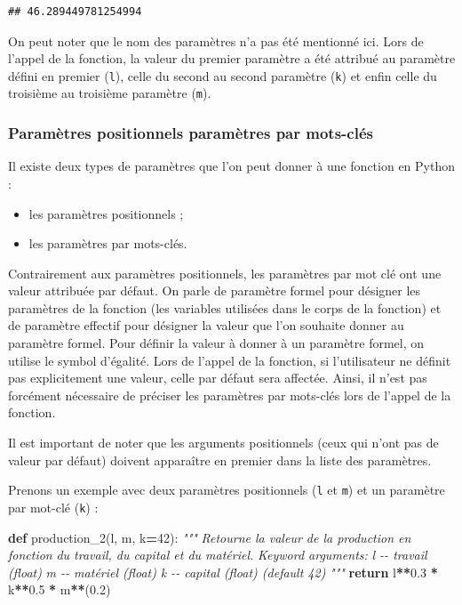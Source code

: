 \documentclass[
  12pt,
]{book}
\newenvironment{Shaded}{\begin{snugshade}}{\end{snugshade}}
\newcommand{\CommentTok}[1]{\textcolor[rgb]{0.56,0.35,0.01}{\textit{#1}}}
\newcommand{\ControlFlowTok}[1]{\textcolor[rgb]{0.13,0.29,0.53}{\textbf{#1}}}
\newcommand{\DecValTok}[1]{\textcolor[rgb]{0.00,0.00,0.81}{#1}}
\newcommand{\FloatTok}[1]{\textcolor[rgb]{0.00,0.00,0.81}{#1}}
\newcommand{\KeywordTok}[1]{\textcolor[rgb]{0.13,0.29,0.53}{\textbf{#1}}}
\newcommand{\NormalTok}[1]{#1}
\newcommand{\OperatorTok}[1]{\textcolor[rgb]{0.81,0.36,0.00}{\textbf{#1}}}
\providecommand{\tightlist}{%
  \setlength{\itemsep}{0pt}\setlength{\parskip}{0pt}}
\numberwithin{equation}{section}
\numberwithin{countremarque}{section}
\begin{document}
\begin{lstlisting}
## 46.289449781254994
\end{lstlisting}

On peut noter que le nom des paramètres n'a pas été mentionné ici. Lors de l'appel de la fonction, la valeur du premier paramètre a été attribué au paramètre défini en premier (\texttt{l}), celle du second au second paramètre (\texttt{k}) et enfin celle du troisième au troisième paramètre (\texttt{m}).

\subsubsection{Paramètres positionnels paramètres par mots-clés}\label{paramuxe8tres-positionnels-paramuxe8tres-par-mots-cluxe9s}

Il existe deux types de paramètres que l'on peut donner à une fonction en Python :

\begin{itemize}
\tightlist
\item
  les paramètres positionnels ;
\item
  les paramètres par mots-clés.
\end{itemize}

Contrairement aux paramètres positionnels, les paramètres par mot clé ont une valeur attribuée par défaut. On parle de paramètre formel pour désigner les paramètres de la fonction (les variables utilisées dans le corps de la fonction) et de paramètre effectif pour désigner la valeur que l'on souhaite donner au paramètre formel. Pour définir la valeur à donner à un paramètre formel, on utilise le symbol d'égalité. Lors de l'appel de la fonction, si l'utilisateur ne définit pas explicitement une valeur, celle par défaut sera affectée. Ainsi, il n'est pas forcément nécessaire de préciser les paramètres par mots-clés lors de l'appel de la fonction.

Il est important de noter que les arguments positionnels (ceux qui n'ont pas de valeur par défaut) doivent apparaître en premier dans la liste des paramètres.

Prenons un exemple avec deux paramètres positionnels (\texttt{l} et \texttt{m}) et un paramètre par mot-clé (\texttt{k}) :

\begin{Shaded}
\begin{Highlighting}[]
\KeywordTok{def}\NormalTok{ production\_2(l, m, k}\OperatorTok{=}\DecValTok{42}\NormalTok{):}
  \CommentTok{"""}
\CommentTok{  Retourne la valeur de la production en fonction}
\CommentTok{  du travail, du capital et du matériel.}
\CommentTok{  }
\CommentTok{  Keyword arguments:}
\CommentTok{  l {-}{-} travail (float)}
\CommentTok{  m {-}{-} matériel (float)}
\CommentTok{  k {-}{-} capital (float) (default 42)}
\CommentTok{  """}
  \ControlFlowTok{return}\NormalTok{ l}\OperatorTok{**}\FloatTok{0.3} \OperatorTok{*}\NormalTok{ k}\OperatorTok{**}\FloatTok{0.5} \OperatorTok{*}\NormalTok{ m}\OperatorTok{**}\NormalTok{(}\FloatTok{0.2}\NormalTok{)}
\end{Highlighting}
\end{Shaded}
\end{document}
